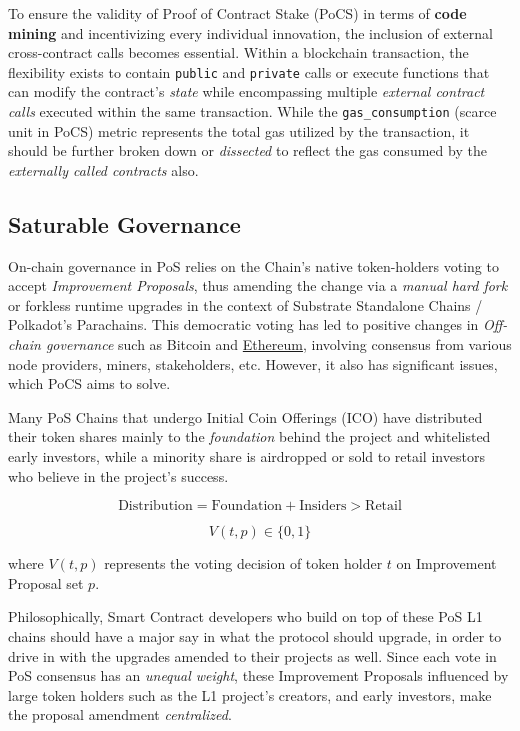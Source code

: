 \documentclass{article}
\begin{document}
To ensure the validity of Proof of Contract Stake (PoCS) in terms of \textbf{code mining} and incentivizing every individual innovation, the inclusion of external cross-contract calls becomes essential. Within a blockchain transaction, the flexibility exists to contain \texttt{public} and \texttt{private} calls or execute functions that can modify the contract's \textit{state} while encompassing multiple \textit{external contract calls} executed within the same transaction. While the \texttt{gas\_consumption} (scarce unit in PoCS) metric represents the total gas utilized by the transaction, it should be further broken down or \textit{dissected} to reflect the gas consumed by the \textit{externally called contracts} also.

\subsection{Saturable Governance}

On-chain governance in PoS relies on the Chain's native token-holders voting to accept \textit{Improvement Proposals}, thus amending the change via a \textit{manual hard fork} or forkless runtime upgrades in the context of Substrate Standalone Chains / Polkadot's Parachains. This democratic voting has led to positive changes in \textit{Off-chain governance} such as Bitcoin and \href{https://ethereum.org/governance}{Ethereum}, involving consensus from various node providers, miners, stakeholders, etc. However, it also has significant issues, which PoCS aims to solve.

Many PoS Chains that undergo Initial Coin Offerings (ICO) have distributed their token shares mainly to the \textit{foundation} behind the project and whitelisted early investors, while a minority share is airdropped or sold to retail investors who believe in the project's success.

\[
\text{Distribution} = \text{Foundation} + \text{Insiders} > \text{Retail}
\]

\[
V(t, p) \in \{ 0, 1\}
\]

where \(V(t, p)\) represents the voting decision of token holder \(t\) on Improvement Proposal set \(p\).

Philosophically, Smart Contract developers who build on top of these PoS L1 chains should have a major say in what the protocol should upgrade, in order to drive in with the upgrades amended to their projects as well. Since each vote in PoS consensus has an \textit{unequal weight}, these Improvement Proposals influenced by large token holders such as the L1 project's creators, and early investors, make the proposal amendment \textit{centralized}.
\end{document}
